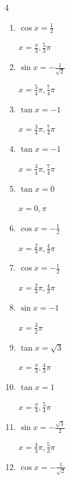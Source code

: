 \begin{multicols}{4}
\begin{enumerate}
  \item $\displaystyle \cos{x}  = \frac{1}{2}$

        $\displaystyle x = \frac{\pi}{3} , \frac{5}{3}\pi$

  \item $\displaystyle \sin{x}  = -\frac{1}{\sqrt{2}}$

        $\displaystyle x = \frac{5}{4}\pi , \frac{7}{4}\pi$

  \item $\displaystyle \tan{x}  = -1$

        $\displaystyle x = \frac{3}{4}\pi , \frac{7}{4}\pi$

  \item $\displaystyle \tan{x}  = -1$

        $\displaystyle x = \frac{3}{4}\pi , \frac{7}{4}\pi$

\columnbreak %

  \item $\displaystyle \tan{x}  = 0$

        $\displaystyle x = 0 , \pi$

  \item $\displaystyle \cos{x}  = -\frac{1}{2}$

        $\displaystyle x = \frac{2}{3}\pi , \frac{4}{3}\pi$

  \item $\displaystyle \cos{x}  = -\frac{1}{2}$

        $\displaystyle x = \frac{2}{3}\pi , \frac{4}{3}\pi$

  \item $\displaystyle \sin{x}  = -1$

        $\displaystyle x = \frac{3}{2}\pi$

  \item $\displaystyle \tan{x}  = \sqrt{3}$

        $\displaystyle x = \frac{\pi}{3} , \frac{4}{3}\pi$

  \item $\displaystyle \tan{x}  = 1$

        $\displaystyle x = \frac{\pi}{4} , \frac{5}{4}\pi$

  \item $\displaystyle \sin{x}  = -\frac{\sqrt{3}}{2}$

        $\displaystyle x = \frac{4}{3}\pi , \frac{5}{3}\pi$

  \item $\displaystyle \cos{x}  = -\frac{1}{\sqrt{2}}$


\end{enumerate}
\end{multicols}
